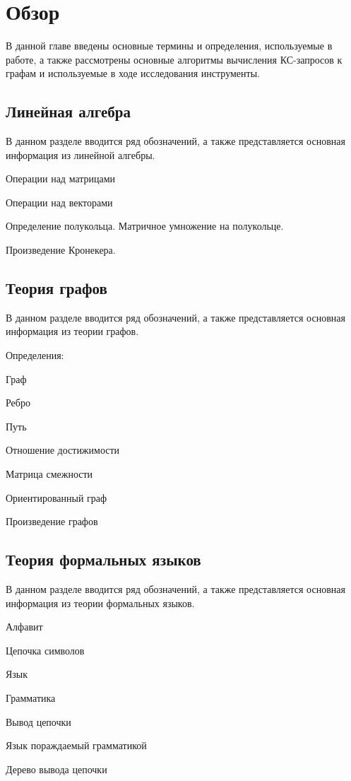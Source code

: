 \chapter{Обзор}\label{ch:ch1}
В данной главе введены основные термины и определения, используемые в работе, а также рассмотрены основные алгоритмы вычисления КС-запросов к графам и используемые в ходе исследования инструменты. 

\section{Линейная алгебра}
В данном разделе вводится ряд обозначений, а также представляется основная информация из линейной алгебры.

Операции над матрицами

Операции над векторами

Определение полукольца. Матричное умножение на полукольце.

Произведение Кронекера.

\section{Теория графов}\label{sec:ch1/sec1}
В данном разделе вводится ряд обозначений, а также представляется основная информация из теории графов.

Определения:

Граф

Ребро

Путь

Отношение достижимости

Матрица смежности

Ориентированный граф

Произведение графов

\section{Теория формальных языков}\label{sec:ch1/sec2}
В данном разделе вводится ряд обозначений, а также представляется основная информация из теории формальных языков.

Алфавит

Цепочка символов

Язык

Грамматика

Вывод цепочки

Язык пораждаемый грамматикой

Дерево вывода цепочки

